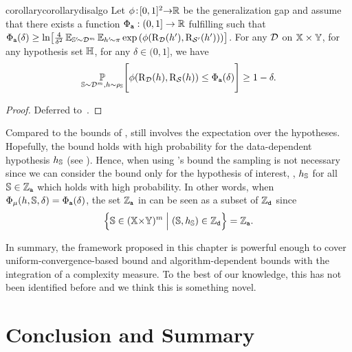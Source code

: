 \begin{restatable}{corollary}{corollarydisalgo} \label{chap:dis-mu:corollary:dis-algo}
Let $\phi\!:\! [0,1]^2{\to}\mathbb{R}$ be the generalization gap and assume that there exists a function $\Phi_{{\tt a}}: (0,1]\to\mathbb{R}$ fulfilling  such that $\Phi_{{\tt a}}(\delta) \ge \ln\!\left[ \frac{4}{\delta^2} \operatorname*{\mathbb{E}}_{\mathbb{S}'\!{\sim}\mathcal{D}^m}\operatorname*{\mathbb{E}}_{h'\!{\sim}\pi} \exp\left(\phi(\text{R}_{\mathcal{D}}(h{'}),\text{R}_{\mathcal{S}'}(h'))\right)\right]$.
For any $\mathcal{D}$ on $\mathbb{X}\times\mathbb{Y}$, for any hypothesis set $\mathbb{H}$, for any $\delta\in(0, 1]$, we have
\begin{align*}
    \operatorname*{\mathbb{P}}_{\mathbb{S}\sim\mathcal{D}^m, h\sim\rho_{\mathbb{S}}}\!\Bigg[ \phi(\text{R}_{\mathcal{D}}(h), \text{R}_{\mathcal{S}}(h)) \le \Phi_{{\tt a}}(\delta) \Bigg] \ge 1-\delta.
\end{align*}
\end{restatable}
\begin{noaddcontents}\begin{proof}
Deferred to~.
\end{proof}\end{noaddcontents}

Compared to the bounds of ,  still involves the expectation over the hypotheses. 
Hopefully, the bound holds with high probability for the data-dependent hypothesis $h_{\mathbb{S}}$ (see ).
Hence, when using 's bound the sampling is not necessary since we can consider the bound only for the hypothesis of interest, \ie, $h_{\mathbb{S}}$ for all $\mathbb{S}\in\mathbb{Z}_{{\tt a}}$ which holds with high probability.
In other words, when $\Phi_{\operatorname{\mu}}(h,\mathbb{S},\delta) = \Phi_{{\tt a}}(\delta)$, the set $\mathbb{Z}_{{\tt a}}$ in  can be seen as a subset of $\mathbb{Z}_{{\tt d}}$ since
\begin{align*}
    \Big\{ \mathbb{S}\in(\mathbb{X}{\times}\mathbb{Y})^m \;\Big|\; (\mathbb{S},h_{\mathbb{S}})\in\mathbb{Z}_{{\tt d}} \Big\} = \mathbb{Z}_{{\tt a}}.
\end{align*}

In summary, the framework proposed in this chapter is powerful enough to cover uniform-convergence-based bound and algorithm-dependent bounds with the integration of a complexity measure. 
To the best of our knowledge, this has not been identified before and we think this is something novel.

\section{Conclusion and Summary}
\label{chap:dis-mu:sec:conclu}

